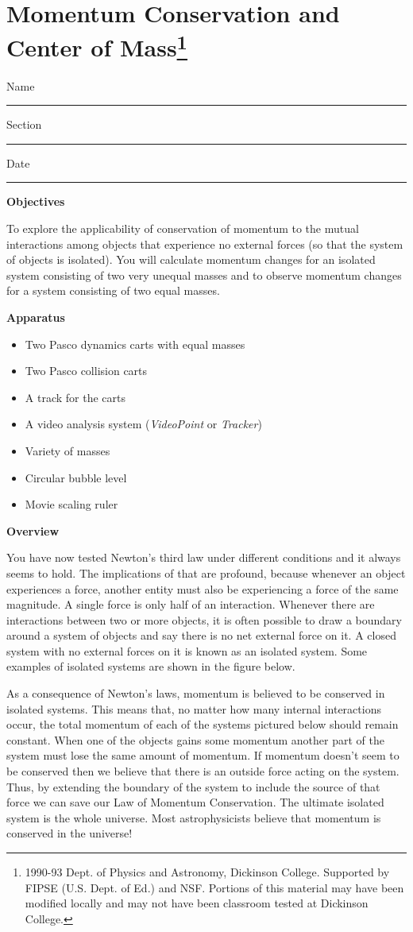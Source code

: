 
\section{Momentum Conservation and Center of Mass\footnote{
1990-93 Dept. of Physics and Astronomy, Dickinson College. Supported by FIPSE
(U.S. Dept. of Ed.) and NSF. Portions of this material may have been modified
locally and may not have been classroom tested at Dickinson College.
}}

Name \rule{2.0in}{0.1pt}\hfill{}Section \rule{1.0in}{0.1pt}\hfill{}Date \rule{1.0in}{0.1pt}

\textbf{Objectives }

To explore the applicability of conservation of momentum to the mutual interactions
among objects that experience no external forces (so that the system of objects
is isolated). You will calculate momentum changes for an isolated system consisting
of two very unequal masses and to observe momentum changes for a system consisting
of two equal masses. 

\textbf{Apparatus}

\begin{itemize}
\item Two Pasco dynamics carts with equal masses
\item Two Pasco collision carts
\item A track for the carts
\item A video analysis system (\textit{VideoPoint} or \textit{Tracker})
\item Variety of masses
\item Circular bubble level
\item Movie scaling ruler
\end{itemize}
\textbf{Overview }

You have now tested Newton's third law under different conditions and it always
seems to hold. The implications of that are profound, because whenever an object
experiences a force, another entity must also be experiencing a force of the
same magnitude. A single force is only half of an interaction. Whenever there
are interactions between two or more objects, it is often possible to draw a
boundary around a system of objects and say there is no net external force on
it. A closed system with no external forces on it is known as an isolated system.
Some examples of isolated systems are shown in the figure below.

As a consequence of Newton's laws, momentum is believed to be conserved in isolated
systems. This means that, no matter how many internal interactions occur, the
total momentum of each of the systems pictured below should remain constant.
When one of the objects gains some momentum another part of the system must
lose the same amount of momentum. If momentum doesn't seem to be conserved then
we believe that there is an outside force acting on the system. Thus, by extending
the boundary of the system to include the source of that force we can save our
Law of Momentum Conservation. The ultimate isolated system is the whole universe.
Most astrophysicists believe that momentum is conserved in the universe!


